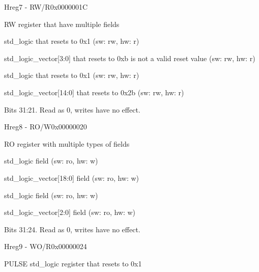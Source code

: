 \documentclass{article}
\begin{document}
\begin{register}{H}{reg7 - RW/R}{0x0000001C}  \par RW register that have multiple fields \regnewline
  \label{reg7}
\regnewline
  \begin{regdesc}\begin{reglist}[field0]
    \item [field0] std{\_}logic that resets to 0x1 (sw: rw, hw: r)
    \item [field1] std{\_}logic{\_}vector[3:0] that resets to 0xb is not a valid reset value (sw: rw, hw: r)
    \item [field2] std{\_}logic that resets to 0x1 (sw: rw, hw: r)
    \item [field3] std{\_}logic{\_}vector[14:0] that resets to 0x2b (sw: rw, hw: r)
    \item [reserved] Bits 31:21. Read as 0, writes have no effect.
  \end{reglist}\end{regdesc}
\end{register}

\begin{register}{H}{reg8 - RO/W}{0x00000020}  \par RO register with multiple types of fields \regnewline
  \label{reg8}
\regnewline
  \begin{regdesc}\begin{reglist}[field0]
    \item [field0] std{\_}logic field (sw: ro, hw: w)
    \item [field1] std{\_}logic{\_}vector[18:0] field (sw: ro, hw: w)
    \item [field2] std{\_}logic field (sw: ro, hw: w)
    \item [field3] std{\_}logic{\_}vector[2:0] field (sw: ro, hw: w)
    \item [reserved] Bits 31:24. Read as 0, writes have no effect.
  \end{reglist}\end{regdesc}
\end{register}

\begin{register}{H}{reg9 - WO/R}{0x00000024}  \par PULSE std{\_}logic register that resets to 0x1 \regnewline
  \label{reg9}
\regnewline
\end{register}
\end{document}
